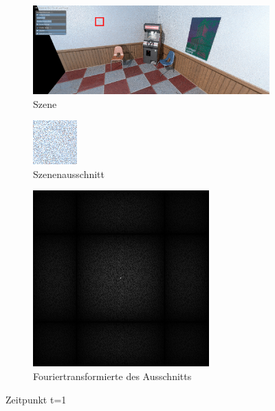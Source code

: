 \begin{figure}[H]

    \begin{subfigure}{\textwidth}
        \centering \includegraphics[scale=.2]{content/TemporalerAlg/Bilder/Screenshotreihe/frame_t_2.0.png}
        \caption{Szene}
        \label{fig:Szene_t1}
    \end{subfigure}
    \begin{subfigure}{0.5\textwidth}
        \centering \includegraphics[width=0.5\linewidth]{content/TemporalerAlg/Bilder/Screenshotreihe/frame_t_2.0_64x64.png} 
        \caption{Szenenausschnitt}
        \label{fig:ausschnitt_t1}
    \end{subfigure}
    \begin{subfigure}{0.5\textwidth}
        \centering \includegraphics[width=0.5\linewidth]{content/TemporalerAlg/Bilder/Screenshotreihe/spektrum/frame_t_2.0_64x64_fourier.png}
        \caption{Fouriertransformierte des Ausschnitts}
        \label{fig:Fouriertransformierte_t1}
    \end{subfigure}
        \caption{Zeitpunkt t=1}
        \label{fig:Verlauf_t1}
\end{figure}

